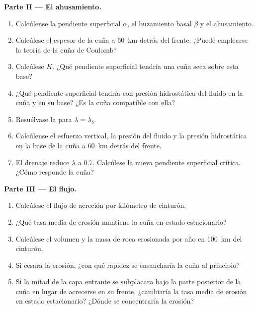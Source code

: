 \begin{problem}
\medskip\noindent\textbf{Parte II --- El ahusamiento.}
\begin{enumerate}[resume]
  \item Calcúlense la pendiente superficial $\alpha$, el buzamiento basal $\beta$ y el
        ahusamiento.
  \item Calcúlese el espesor de la cuña a \qty{60}{km} detrás del frente. ¿Puede
        emplearse la teoría de la cuña de Coulomb?
  \item Calcúlese $K$. ¿Qué pendiente superficial tendría una cuña seca sobre esta base?
  \item ¿Qué pendiente superficial tendría con presión hidrostática del fluido en
        la cuña y en su base? ¿Es la cuña compatible con ella?
  \item Resuélvase la  para $\lambda = \lambda_b$.
  \item Calcúlense el esfuerzo vertical, la presión del fluido y la presión
        hidrostática en la base de la cuña a \qty{60}{km} detrás del frente.
  \item El drenaje reduce $\lambda$ a 0.7. Calcúlese la nueva pendiente superficial
        crítica. ¿Cómo responde la cuña?
\end{enumerate}

\medskip\noindent\textbf{Parte III --- El flujo.}
\begin{enumerate}[resume]
  \item Calcúlese el flujo de acreción por kilómetro de cinturón.
  \item ¿Qué tasa media de erosión mantiene la cuña en estado estacionario?
  \item Calcúlese el volumen y la masa de roca erosionada por año en
        \qty{100}{km} del cinturón.
  \item Si cesara la erosión, ¿con qué rapidez se ensancharía la cuña al principio?
  \item Si la mitad de la capa entrante se subplacara bajo la parte posterior de la
        cuña en lugar de acrecerse en su frente, ¿cambiaría la tasa media de erosión
        en estado estacionario? ¿Dónde se concentraría la erosión?
\end{enumerate}


\end{problem}
